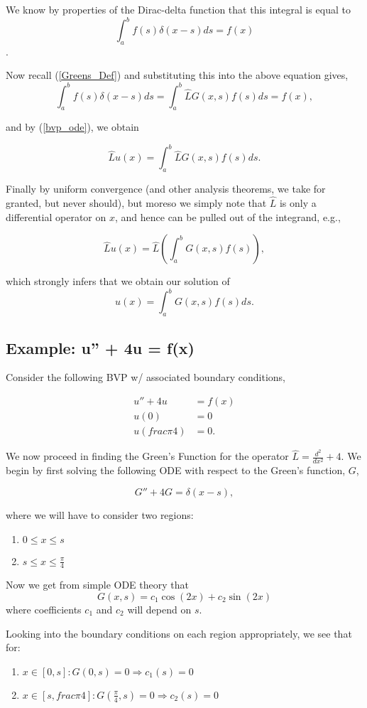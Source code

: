 We know by properties of the Dirac-delta function that this integral is equal to
$$\int_a^b f(s) \delta(x-s) ds = f(x)$$.

Now recall (\ref{Greens_Def}) and substituting this into the above equation gives,
$$\int_a^b f(s) \delta(x-s) ds = \int_a^b \hat{L} G(x,s) f(s) ds  =  f(x),$$

and by (\ref{bvp_ode}), we obtain

$$\hat{L}u(x) = \int_a^b \hat{L} G(x,s) f(s) ds .$$

Finally by uniform convergence (and other analysis theorems, we take for granted, but never should), but moreso we simply note that $\hat{L}$ is only a differential operator on $x$, and hence can be pulled out of the integrand, e.g.,

$$\hat{L}u(x) = \hat{L} \left( \int_a^b  G(x,s) f(s) \right),$$

which strongly infers that we obtain our solution of
\begin{equation}
u(x) = \int_a^b G(x,s) f(s) ds.
\end{equation}


\subsection{Example: u'' + 4u = f(x) }

Consider the following BVP w/ associated boundary conditions,

\begin{align}
u'' + 4u &= f(x) \\
u(0) &= 0 \\
u\left(  frac{\pi}{4} \right)  &= 0.
\end{align}

We now proceed in finding the Green's Function for the operator $\hat{L} = \frac{d^2}{dx^2} + 4.$ We begin by first solving the following ODE with respect to the Green's function, $G$,

$$G'' + 4G = \delta(x-s),$$

where we will have to consider two regions:
\begin{enumerate}
\item $0\leq x\leq s$
\item $s\leq x \leq \frac{\pi}{4}$
\end{enumerate}

Now we get from simple ODE theory that
$$G(x,s) = c_1 \cos(2x) + c_2 \sin(2x)$$
where coefficients $c_1$ and $c_2$ will depend on $s$.

Looking into the boundary conditions on each region appropriately, we see that for:
\begin{enumerate}
\item $x\in [0,s] : G(0,s) = 0 \Rightarrow c_1(s) = 0$
\item $x\in [s,frac{\pi}{4}] : G\left(\frac{\pi}{4},s\right) = 0 \Rightarrow c_2(s) = 0$
\end{enumerate}

